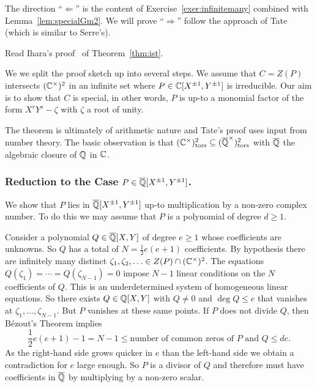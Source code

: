 The direction ``$\Longleftarrow$'' is the content of
Exercise~\ref{exer:infinitemany} combined with
Lemma~\ref{lem:specialGm2}. We will prove ``$\Longrightarrow$'' follow
the approach of Tate (which is similar to Serre's).

\begin{exercise}
  Read Ihara's proof~\cite{Lang:Division} of Theorem~\ref{thm:ist}.
\end{exercise}

We we split the proof sketch up into several steps. We assume that
$C=Z(P)$ intersects $({\mathbb{C}}^\times)^2$ in an infinite set where $P\in
{\mathbb{C}}[X^{\pm 1},Y^{\pm 1}]$ is irreducible.
Our aim is to show that $C$ is special, in other words, $P$ is up-to a
monomial factor of the form $X^rY^s-\zeta$ with $\zeta$ a root of
unity. 

The theorem is ultimately of arithmetic nature and Tate's proof uses
input from number theory. The basic observation is that
$({\mathbb{C}}^\times)^2_{\mathrm{tors}}\subseteq
({\overline{\mathbb{Q}}}^\times)^2_{\mathrm{tors}}$ with ${\overline{\mathbb{Q}}}$ the algebraic closure
of ${\mathbb{Q}}$ in ${\mathbb{C}}$.

\subsubsection{Reduction to the Case $P \in {\overline{\mathbb{Q}}}[X^{\pm
    1},Y^{\pm 1}]$.}

We show that $P$ lies in ${\overline{\mathbb{Q}}}[X^{\pm 1},Y^{\pm 1}]$ up-to
multiplication by a non-zero complex number. To do this we may assume
that $P$ is a polynomial of degree $d\ge 1$.

Consider a polynomial $Q\in
{\overline{\mathbb{Q}}}[X,Y]$ of degree $e\ge 1$ whose coefficients are unknowns. So
$Q$ has a total of $N = \frac 12 e(e+1)$ coefficients. 
By hypothesis there are infinitely many distinct
$\zeta_1,\zeta_2,\ldots \in Z(P)\cap ({\mathbb{C}}^\times)^2$.
The equations $Q(\zeta_1) = \cdots = Q(\zeta_{N-1})=0$
impose $N-1$ linear conditions on the $N$ coefficients of
$Q$.
This is an underdetermined system of homogeneous linear equations. So
there exists $Q\in {\mathbb{Q}}[X,Y]$ with $Q\not=0$  and $\deg Q \le e$ that vanishes at
$\zeta_1,\ldots,\zeta_{N-1}$. But $P$ vanishes at these same points.
If $P$ does not divide $Q$, then B\'ezout's Theorem implies
\begin{equation*}
  \frac 12 e(e+1)-1=  N-1 \le \text{number of common zeros of $P$ and $Q$} \le de.
\end{equation*}
As the right-hand side grows quicker in $e$ than the left-hand side we obtain a
contradiction for $e$ large enough. So $P$ is a divisor of $Q$ and
therefore must have coefficients in ${\overline{\mathbb{Q}}}$ by multiplying by a non-zero
scalar. 

